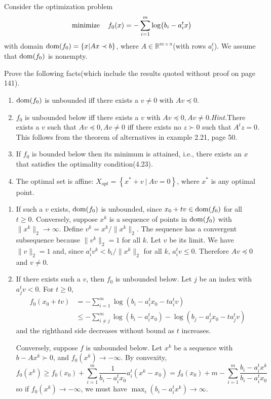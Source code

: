 \begin{problem}[4.2]
    Consider the optimization problem\[\operatorname{minimize} \quad f_0(x) = -\sum_{i = 1}^m\log(b_i - a_i^tx)\] with domain $\operatorname{dom}(f_0) = \left\{x | Ax \prec b\right\}$, where $A \in \mathbb{R}^{m \times n}$(with rows $a_i^t$). We assume that $\operatorname{dom}(f_0)$ is nonempty.

    Prove the following facts(which include the results quoted without proof on page 141).
    \begin{enumerate}
        \item $\operatorname{dom}(f_0)$ is unbounded iff there exists a $v \neq 0$ with $Av \preceq 0$.
        \item $f_0$ is unbounded below iff there exists a $v$ with $Av \preceq 0, Av \neq 0$.\textit{Hint.}There exists a $v$ such that $Av \preceq 0, Av \neq 0$ iff there exists no $z \succ 0$ such that $A^tz = 0$. This follows from the theorem of alternatives in example 2.21, page 50.
        \item If $f_0$ is bounded below then its minimum is attained, i.e., there exists an $x$ that satisfies the optimality condition(4.23).
        \item The optimal set is affine: $X_{opt} = \left\{x^* + v\ |\ Av = 0\right\}$, where $x^*$ is any optimal point.
    \end{enumerate}
    \Answer \text{}\begin{enumerate}
        \item If such a $v$ exists, $\operatorname{dom}(f_0)$ is unbounded, since $x_0 + tv \in \operatorname{dom}(f_0)$ for all $t \ge 0$. Conversely, suppose $x^k$ is a sequence of points in $\operatorname{dom}(f_0)$ with $\|x^k\|_2 \to \infty$. Define $v^k = x^k / \|x^k\|_2$. The sequence has a convergent subsequence because $\|v^k\|_2 = 1$ for all $k$. Let $v$ be its limit. We have $\|v\|_2 = 1$ and, since $a_i^tv^k < b_i / \|x^k\|_2$ for all $k$, $a_i^tv \le 0$. Therefore $Av \preceq 0$ and $v \neq 0$.
        \item If there exists such a $v$, then $f_0$ is unbounded below. Let $j$ be an index with $a_j^tv < 0$. For $t \ge 0$, \begin{align*}
            f_0(x_0 + tv) &= -\sum_{i = 1}^m\log(b_i - a_i^tx_0 - ta_i^tv)\\
            & \le -\sum_{i \neq j}^m\log(b_i - a_i^tx_0) - \log(b_j - a_j^tx_0 - ta_j^tv)
        \end{align*} and the righthand side decreases without bound as $t$ increases.

        Conversely, suppose $f$ is unbounded below. Let $x^k$ be a sequence with $b - Ax^k \succ 0$, and $f_0(x^k) \to -\infty$. By convexity,\[f_0(x^k) \ge f_0(x_0) + \sum_{i = 1}^m\frac{1}{b_i - a_i^tx_0}a_i^t(x^k - x_0) = f_0(x_0) + m - \sum_{i = 1}^m\frac{b_i - a_i^tx^k}{b_i - a_i^tx_0}\] so if $f_0(x^k) \to -\infty$, we must have $\max_i(b_i - a_i^tx^k) \to \infty$.


\end{enumerate}
\end{problem}
